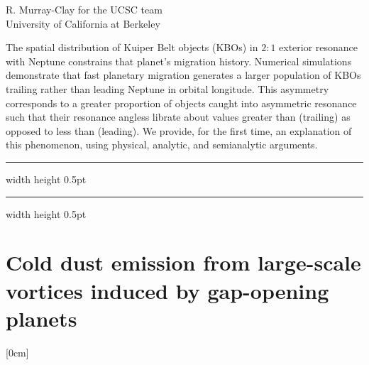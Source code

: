 \documentclass[a4paper,11pt]{book}
\def\doubleline{
\hrule width \hsize height 0.5pt  \kern 1mm \hrule width \hsize height 0.5pt 
}
\begin{document}
\begin{center}
    
{\large R. Murray-Clay for the UCSC team}\\
  
\vspace{2 mm}
\noindent University of California at Berkeley\\

\end{center}



  
\vspace{2 mm}
\noindent The spatial distribution of Kuiper Belt objects (KBOs) in $2:1$ exterior resonance with Neptune constrains that planet’s migration history. Numerical simulations demonstrate that fast planetary migration generates a larger population of KBOs trailing rather than leading Neptune in orbital longitude. This asymmetry corresponds to a greater proportion of objects caught into asymmetric resonance such that their resonance angless librate about values greater than (trailing) as opposed to less than (leading). We provide, for the first time, an explanation of this phenomenon, using physical, analytic, and semianalytic arguments.

\noindent\doubleline
        
          \section[Cold dust emission from large-scale vortices induced by gap-opening planets \newline(Clément Baruteau)] { Cold dust emission from large-scale vortices induced by gap-opening planets }



[0cm]
\end{document}
